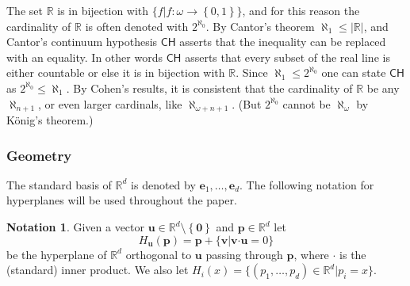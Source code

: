 \documentclass[12pt]{amsart}
\newcommand{\CH}{{\mathsf{CH}}}	%
\newcommand{\R}{\mathbb{R}}	%
\newcommand{\ZFC}{\mathsf{ZFC}}		%
\newcommand{\Mid}{\boldsymbol\mid}			%
\newcommand{\setof}[2]{\mathopen \{{#1}\Mid{#2} \mathclose\}} %
\newcommand{\setLR}[1]{\left \{ {#1} \right \}} %
\newcommand{\card}[1]{\mathopen | #1 \mathclose |}		%
\theoremstyle{plain}
\theoremstyle{definition}
\newtheorem{notation}[theorem]{Notation}
\theoremstyle{remark}
\begin{document}
The set \( \R \) is in bijection with \( \setof{ f}{ f \colon \omega \to \setLR{ 0 , 1 }} \), and for this reason the cardinality of \( \R \) is often denoted with \( 2^{\aleph_0} \).
By Cantor's theorem \( \aleph_1 \leq \card{\R} \), and Cantor's continuum hypothesis \( \CH \) asserts that the inequality can be replaced with an equality.
In other words \( \CH \) asserts that every subset of the real line is either countable or else it is in bijection with \( \R \).
Since \( \aleph_1 \leq 2^{\aleph_0} \) one can state \( \CH \) as \( 2^{\aleph_0} \leq \aleph_1 \).
By Cohen's results, it is consistent that the cardinality of \( \R \) be any \( \aleph_{ n + 1 } \), or even larger cardinals, like \( \aleph_{ \omega + n + 1 } \).
(But \( 2^{\aleph_0} \) cannot be \( \aleph_ \omega \) by König's theorem.)

\subsubsection{Geometry}
The standard basis of \( \R^d \) is denoted by \( \mathbf{e}_1 , \dots , \mathbf{e}_d \).
The following notation for hyperplanes will be used throughout the paper.

\begin{notation}\label{ntn:hyperplane}
Given a vector \( \mathbf{u} \in \R^d \setminus \setLR{ \mathbf{0} } \) and \( \mathbf{p} \in \R^d \) let 
\[
H_{\mathbf{u}} ( \mathbf{p} ) = \mathbf{p} + \setof{ \mathbf{v} }{ \mathbf{v} \boldsymbol{\cdot} \mathbf{u} = 0 }
\]
be the hyperplane of \( \R^d \) orthogonal to \( \mathbf{u} \) passing through \( \mathbf{p} \), where \( \boldsymbol{\cdot} \) is the (standard) inner product.
We also let \( H_i ( x ) = \setof{ ( p_1 , \dots , p_d ) \in \R^d }{ p_i = x } \).
\end{notation}
\end{document}

